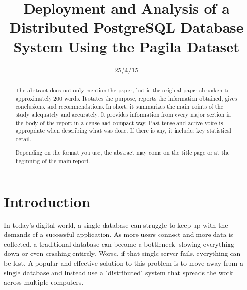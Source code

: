 \documentclass[conference]{IEEEtran}
\begin{document}
\title{Deployment and Analysis of a Distributed PostgreSQL Database System Using the Pagila Dataset}


\author{
}
\date{25/4/15}

\maketitle

\begin{abstract}
The abstract does not only mention the paper, but is the original paper shrunken to approximately 200 words. It states the purpose, reports the information obtained, gives conclusions, and recommendations. In short, it summarizes the main points of the study adequately and accurately. It provides information from every major section in the body of the report in a dense and compact way. Past tense and active voice is appropriate when describing what was done. If there is any, it includes key statistical detail.  

Depending on the format you use, the abstract may come on the title page or at the beginning of the main report.

\end{abstract}





\section{Introduction}

In today's digital world, a single database can struggle to keep up with the demands of a successful application. As more users connect and more data is collected, a traditional database can become a bottleneck, slowing everything down or even crashing entirely. Worse, if that single server fails, everything can be lost. A popular and effective solution to this problem is to move away from a single database and instead use a "distributed" system that spreads the work across multiple computers.
\end{document}
